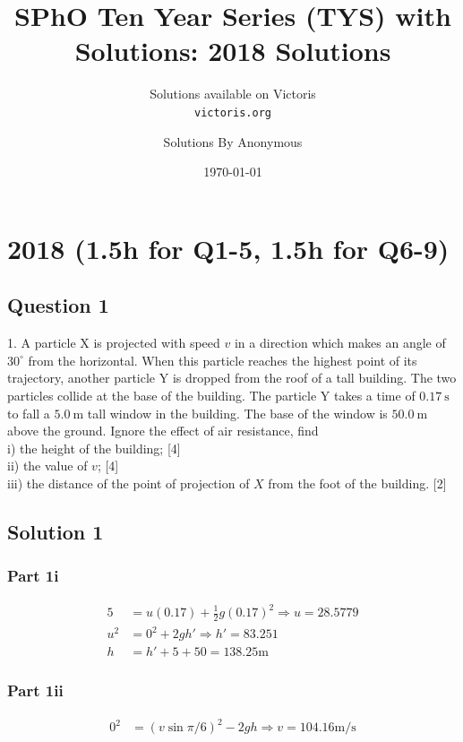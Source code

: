 \documentclass{article}
\title{SPhO Ten Year Series (TYS) with Solutions: 2018 Solutions}
\author{
    Solutions available on Victoris\\
    \texttt{victoris.org}
    \and 
    Solutions By Anonymous
}
\date{\today}
\begin{document}
\maketitle

\section{2018 (1.5h for Q1-5, 1.5h for Q6-9)}
\subsection{Question 1}
1. A particle $\mathrm{X}$ is projected with speed $v$ in a direction which makes an angle of $30^{\circ}$ from the horizontal. When this particle reaches the highest point of its trajectory, another particle $\mathrm{Y}$ is dropped from the roof of a tall building. The two particles collide at the base of the building. The particle $\mathrm{Y}$ takes a time of $0.17 \mathrm{~s}$ to fall a $5.0 \mathrm{~m}$ tall window in the building. The base of the window is $50.0 \mathrm{~m}$ above the ground. Ignore the effect of air resistance, find \\
i) the height of the building; [4] \\
ii) the value of $v$; [4] \\
iii) the distance of the point of projection of $X$ from the foot of the building. [2]

\subsection{Solution 1}
\subsubsection{Part 1i}
\begin{align}
    5 &= u(0.17) + \frac{1}{2}g(0.17)^2 \Rightarrow u=28.5779 \\
    u^2 &= 0^2+2gh' \Rightarrow h' = 83.251 \\
    h &= h' + 5 + 50 = 138.25 \mathrm{m}
\end{align}

\subsubsection{Part 1ii}
\begin{align}
    0^2 &= (v\sin\pi/6 )^2 - 2gh \Rightarrow v = 104.16 \mathrm{m/s}
\end{align}
\end{document}
